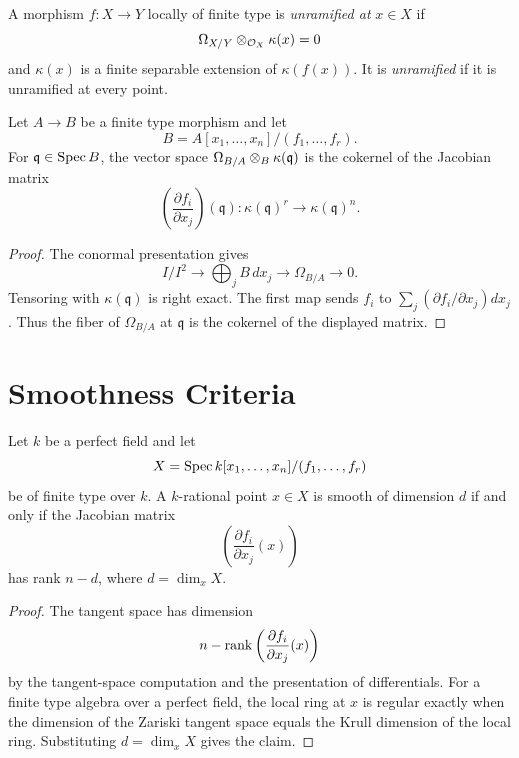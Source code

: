 \begin{definition}
A morphism \(f:X\to Y\) locally of finite type is \emph{unramified at}
\(x\in X\) if
\[
    \Omega_{X/Y}\otimes_{\mathcal{O}_X}\kappa(x)=0
\]
and \(\kappa(x)\) is a finite separable extension of \(\kappa(f(x))\).  It is
\emph{unramified} if it is unramified at every point.
\end{definition}

\begin{proposition}
Let \(A\to B\) be a finite type morphism and let
\[
    B=A[x_1,\ldots,x_n]/(f_1,\ldots,f_r).
\]
For \(\mathfrak q\in\operatorname{Spec} B\), the vector space
\(\Omega_{B/A}\otimes_B\kappa(\mathfrak q)\) is the cokernel of the Jacobian
matrix
\[
    \left(\frac{\partial f_i}{\partial x_j}\right)(\mathfrak q):
    \kappa(\mathfrak q)^r\to\kappa(\mathfrak q)^n.
\]
\end{proposition}

\begin{proof}
The conormal presentation gives
\[
    I/I^2\to \bigoplus_j B\,dx_j\to\Omega_{B/A}\to0.
\]
Tensoring with \(\kappa(\mathfrak q)\) is right exact.  The first map sends
\(f_i\) to \(\sum_j(\partial f_i/\partial x_j)dx_j\).  Thus the fiber of
\(\Omega_{B/A}\) at \(\mathfrak q\) is the cokernel of the displayed matrix.
\end{proof}

\section{Smoothness Criteria}

\begin{theorem}
Let \(k\) be a perfect field and let
\[
    X=\operatorname{Spec} k[x_1,\ldots,x_n]/(f_1,\ldots,f_r)
\]
be of finite type over \(k\).  A \(k\)-rational point \(x\in X\) is smooth of
dimension \(d\) if and only if the Jacobian matrix
\[
    \left(\frac{\partial f_i}{\partial x_j}(x)\right)
\]
has rank \(n-d\), where \(d=\dim_x X\).
\end{theorem}

\begin{proof}
The tangent space has dimension
\[
    n-\operatorname{rank}\left(\frac{\partial f_i}{\partial x_j}(x)\right)
\]
by the tangent-space computation and the presentation of differentials.  For a
finite type algebra over a perfect field, the local ring at \(x\) is regular
exactly when the dimension of the Zariski tangent space equals the Krull
dimension of the local ring.  Substituting \(d=\dim_x X\) gives the claim.
\end{proof}

